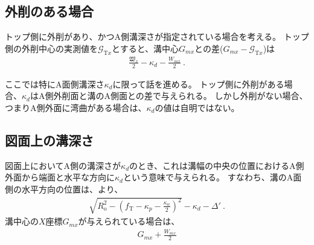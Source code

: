 \subsection{外削のある場合}
トップ側に外削があり、かつA側溝深さが指定されている場合を考える。
トップ側の外削中心の実測値を$\mathcal G_{\mathrm Tx}$とすると、溝中心$G_{mx}$との差($G_{mx}-\mathcal G_{\mathrm Tx}$)は
\begin{align}
  \label{eq:mizocenterAG}
  \frac{\mathfrak W_x}2-\kappa_d-\frac{W_{mx}}2\ .
\end{align}



\clearpage
ここでは特にA面側溝深さ$\kappa_d$に限って話を進める。
トップ側に外削がある場合、$\kappa_d$はA側外削面と溝のA側面との差で与えられる。
しかし外削がない場合、つまりA側外面に湾曲がある場合は、$\kappa_d$の値は自明ではない。


\subsection{図面上の溝深さ}
図面上においてA側の溝深さが$\kappa_d$のとき、これは溝幅の中央の位置におけるA側外面から端面と水平な方向に$\kappa_d$という意味で与えられる。
すなわち、溝のA面側の水平方向の位置は、より、
\begin{align*}
  \sqrt{R_\mathrm o^2-\left(f_\mathrm T-\kappa_p-\frac{\kappa_w}2\right)^{\!2}}-\kappa_d-\varDelta'\ .
\end{align*}
溝中心の$X$座標$G_{mx}$が与えられている場合は、
\begin{align*}
  G_{mx}+\frac{W_{mx}}2
\end{align*}




